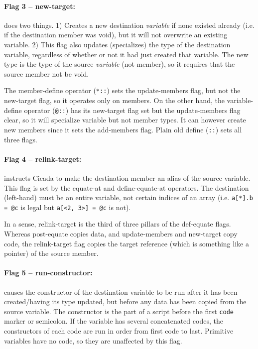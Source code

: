 \documentclass{article}
\begin{document}
\paragraph{Flag 3 -- new-target:}  does two things.  1) Creates a new destination \emph{variable} if none existed already (i.e. if the destination member was void), but it will not overwrite an existing variable.  2) This flag also updates (specializes) the type of the destination variable, regardless of whether or not it had just created that variable.  The new type is the type of the source \emph{variable} (not member), so it requires that the source member not be void.

The member-define operator (\verb#*::#) sets the update-members flag, but not the new-target flag, so it operates only on members.  On the other hand, the variable-define operator (\verb#@::#) has its new-target flag set but the update-members flag clear, so it will specialize variable but not member types.  It can however create new members since it sets the add-members flag.  Plain old define (\verb#::#) sets all three flags.\\


\paragraph{Flag 4 -- relink-target:}  instructs Cicada to make the destination member an alias of the source variable.  This flag is set by the equate-at and define-equate-at operators.  The destination (left-hand) must be an entire variable, not certain indices of an array (i.e. \verb#a[*].b = @c# is legal but \verb#a[<2, 3>] = @c# is not).

In a sense, relink-target is the third of three pillars of the def-equate flags.  Whereas post-equate copies data, and update-members and new-target copy code, the relink-target flag copies the target reference (which is something like a pointer) of the source member.\\


\paragraph{Flag 5 -- run-constructor:}  causes the constructor of the destination variable to be run after it has been created/having its type updated, but before any data has been copied from the source variable.  The constructor is the part of a script before the first \verb#code# marker or semicolon.  If the variable has several concatenated codes, the constructors of each code are run in order from first code to last.  Primitive variables have no code, so they are unaffected by this flag.
\end{document}
